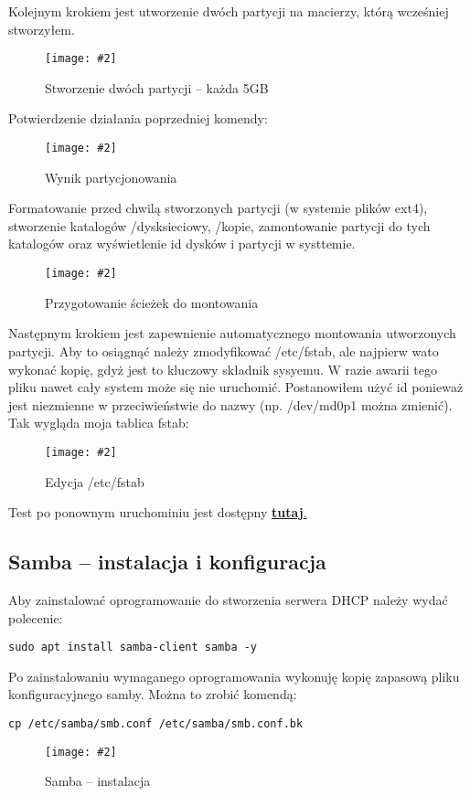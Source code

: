 \documentclass[a4paper]{article}
\newcommand*{\zdj}[2][\textwidth]{\texttt{[image: \#2]}}
\newcommand*{\fg}[4][!htb]{
      \begin{figure*}[#1]
            \zdj{#2}
            \caption[#4]{#3}
      \end{figure*}
}
\begin{document}
\newpage
Kolejnym krokiem jest utworzenie dwóch partycji na macierzy, którą wcześniej stworzyłem.
\fg{contents/configuration/Raid5/5.png}{Stworzenie dwóch partycji – każda 5GB}{Stworzenie dwóch partycji}

Potwierdzenie działania poprzedniej komendy: 
\fg{contents/configuration/Raid5/6.png}{Wynik partycjonowania}{Wynik partycjonowania}

\newpage
Formatowanie przed chwilą stworzonych partycji (w systemie plików ext4), stworzenie katalogów /dysksieciowy, /kopie, zamontowanie partycji do tych katalogów oraz wyświetlenie id dysków i partycji w systtemie.
\fg{contents/configuration/Raid5/7.png}{Przygotowanie ścieżek do montowania}{Przygotowanie ścieżek do montowania}

Następnym krokiem jest zapewnienie automatycznego montowania utworzonych partycji. Aby to osiągnąć należy zmodyfikować /etc/fstab, ale najpierw wato wykonać kopię, gdyż jest to kluczowy składnik sysyemu. W razie awarii tego pliku nawet cały system może się nie uruchomić. Postanowiłem użyć id ponieważ jest niezmienne w przeciwieństwie do nazwy (np. /dev/md0p1 można zmienić). Tak wygląda moja tablica fstab:
\fg{contents/configuration/Raid5/9.png}{Edycja /etc/fstab}{Edycja /etc/fstab}
\vspace*{-5pt}
Test po ponownym uruchominiu jest dostępny \hyperref[fig:raid5-auto-mount-test]{\textbf{tutaj}.}

\vspace*{-5pt}
\subsection{Samba – instalacja i konfiguracja}
\vspace*{-5pt}
Aby zainstalować oprogramowanie do stworzenia serwera DHCP należy wydać polecenie:
\vspace*{-5pt}
\begin{Verbatim}[frame=single]
      sudo apt install samba-client samba -y
\end{Verbatim}
\vspace*{-5pt}

Po zainstalowaniu wymaganego oprogramowania wykonuję kopię zapasową pliku konfiguracyjnego samby. Można to zrobić komendą:
\vspace*{-5pt}
\begin{Verbatim}[frame=single]
cp /etc/samba/smb.conf /etc/samba/smb.conf.bk
\end{Verbatim}
\fg{contents/configuration/Samba/2.png}{Samba – instalacja}{Samba – instalacja}
\newpage
\end{document}
